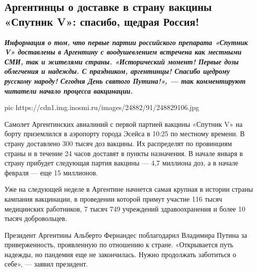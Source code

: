  
 
 
 
 
 
\subsection{Аргентинцы о доставке в страну вакцины «Спутник V»: спасибо, щедрая Россия!}
\label{sec:25_12_2020.news.ru.inosmi.1.argentina_russia_sputnik_v}

\begin{leftbar}
  \begingroup
    \em\Large\bfseries\color{blue}
Информация о том, что первые партии российского препарата «Спутник V»
доставлены в Аргентину с воодушевлением встречена как местными СМИ, так и
жителями страны. «Исторический момент! Первые дозы облегчения и надежды. С
праздником, аргентинцы! Спасибо щедрому русскому народу! Сегодня День святого
Путина!», — так комментируют читатели начало процесса вакцинации.
  \endgroup
\end{leftbar}


\ifcmt
  pic https://cdn1.img.inosmi.ru/images/24882/91/248829106.jpg
\fi

Самолет Аргентинских авиалиний с первой партией вакцины «Спутник V» на борту
приземлился в аэропорту города Эсейса в 10:25 по местному времени. В страну
доставлено 300 тысяч доз вакцины. Их распределят по провинциям страны и в
течение 24 часов доставят в пункты назначения. В начале января в страну
прибудет следующая партия вакцины — 4,7 миллиона доз, а в начале февраля — еще
15 миллионов.

Уже на следующей неделе в Аргентине начнется самая крупная в истории страны
кампания вакцинации, в проведении которой примут участие 116 тысяч медицинских
работников, 7 тысяч 749 учреждений здравоохранения и более 10 тысяч
добровольцев.

Президент Аргентины Альберто Фернандес поблагодарил Владимира Путина за
приверженность, проявленную по отношению к стране. «Открывается путь надежды,
но пандемия еще не закончилась. Нужно продолжать заботиться о себе», — заявил
президент.

